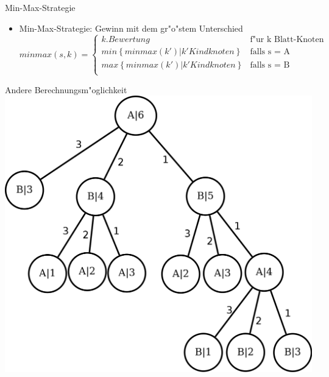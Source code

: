 \documentclass[18pt]{beamer}
\begin{document}
\begin{frame}{Min-Max-Strategie}
\begin{itemize}
\item Min-Max-Strategie: Gewinn mit dem gr"o"stem Unterschied
\begin{equation}
   minmax(s,k) =
   \begin{cases}
     k.Bewertung & \text{f"ur k Blatt-Knoten} \\
     min\left\{minmax(k') | k' Kindknoten\right\} & \text{falls s = A} \\
     max\left\{minmax(k') | k' Kindknoten\right\} & \text{falls s = B} \\
   \end{cases}
\end{equation}
\end{itemize}
\end{frame}

\begin{frame}{Andere Berechnungsm"oglichkeit}
\includegraphics[scale=0.4]{baum0.png}
\end{frame}
\end{document}
